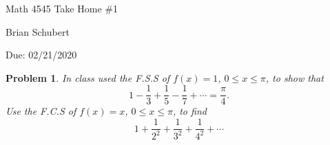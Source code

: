 \documentclass[a4paper,12pt]{article} %
\theoremstyle{plain}
\newtheorem{problem}{Problem}
\begin{document}
\begin{center}
    \huge
    Math 4545 Take Home \#1

    \vspace{0.5cm}
    \large
    Brian Schubert

    \vspace{0.5cm}
    Due: 02/21/2020
\end{center}

\begin{problem}
    In class used the F.S.S of $f(x)=1$, $0 \leq x \leq \pi$,
    to show that \begin{equation*}
     1-\frac{1}{3}+\frac{1}{5}-\frac{1}{7}+\cdots = \frac{\pi}{4}.
     \end{equation*} 
     Use the F.C.S of $f(x)=x$, $0\leq x \leq \pi$, to find \begin{equation*}
        1 + \frac{1}{2^2} + \frac{1}{3^2} + \frac{1}{4^2} + \cdots
     \end{equation*}
\end{problem}
\end{document}
